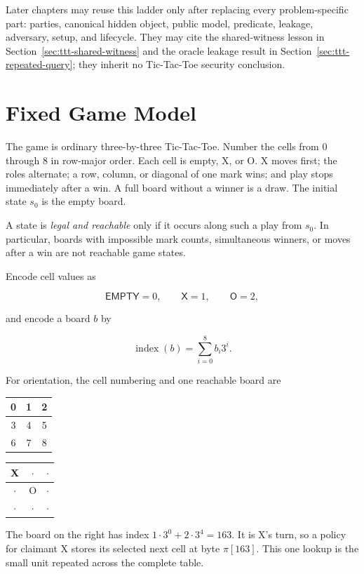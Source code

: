 Later chapters may reuse this ladder only after replacing every
problem-specific part: parties, canonical hidden object, public model,
predicate, leakage, adversary, setup, and lifecycle. They may cite the
shared-witness lesson in Section~\ref{sec:ttt-shared-witness} and the oracle
leakage result in Section~\ref{sec:ttt-repeated-query}; they inherit no
Tic-Tac-Toe security conclusion.

\section{Fixed Game Model}
\label{sec:ttt-model}

The game is ordinary three-by-three Tic-Tac-Toe. Number the cells from $0$
through $8$ in row-major order. Each cell is empty, X, or O. X moves first;
the roles alternate; a row, column, or diagonal of one mark wins; and play
stops immediately after a win. A full board without a winner is a draw. The
initial state $s_0$ is the empty board.

A state is \emph{legal and reachable} only if it occurs along such a play from
$s_0$. In particular, boards with impossible mark counts, simultaneous
winners, or moves after a win are not reachable game states.

Encode cell values as

\[
    \mathsf{EMPTY}=0,\qquad \mathsf{X}=1,\qquad \mathsf{O}=2,
\]

and encode a board $b$ by

\[
    \operatorname{index}(b)=\sum_{i=0}^{8} b_i 3^i.
\]

For orientation, the cell numbering and one reachable board are

\begin{center}
\begin{tabular}{c|c|c}
0 & 1 & 2 \\ \hline
3 & 4 & 5 \\ \hline
6 & 7 & 8
\end{tabular}
\qquad
\begin{tabular}{c|c|c}
X & $\cdot$ & $\cdot$ \\ \hline
$\cdot$ & O & $\cdot$ \\ \hline
$\cdot$ & $\cdot$ & $\cdot$
\end{tabular}
\end{center}

The board on the right has index
$1\cdot3^0+2\cdot3^4=163$. It is X's turn, so a policy for claimant X
stores its selected next cell at byte $\pi[163]$. This one lookup is the small
unit repeated across the complete table.

